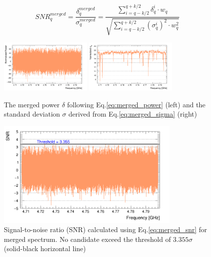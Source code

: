 \begin{equation}
    \label{eq:merged_snr}
    {SNR}_{q}^{merged} = \frac{\delta^{merged}_{q}}{\sigma^{merged}_{q}} = \frac{\sum_{i = q-k/2}^{q+k/2}\delta_{q}^{i} \cdot {w_{q}}}{ \sqrt{\sum_{i = q-k/2}^{q+k/2} (\sigma_{q}^{i})^2 \cdot {w_{q}^2}}}
\end{equation}


\begin{figure}[h]
    \centering
    \includegraphics[width=0.4\textwidth,height = 0.3\textwidth]{figures/Power_GrandSpectrum_AxionRun_AllSteps_Rescan_Merged_5bin_SG4_W201_LqWeight.png}
    \includegraphics[width=0.4\textwidth,height = 0.3\textwidth]{figures/Sigma_GrandSpectrum_AxionRun_AllSteps_Rescan_Merged_5bin_SG4_W201_LqWeight.png}
    \caption{The merged power $\delta$ following Eq.\eqref{eq:merged_power} (left) and the standard deviation $\sigma$ derived from Eq.\eqref{eq:merged_sigma} (right)}
    \label{fig:power_sigma_merged}
\end{figure}

\begin{figure}[hbt!]
    \centering
    \includegraphics[width=0.8\textwidth,height=0.4\textwidth]{figures/SNR_GrandSpectrum_AxionRun_AllSteps_Rescan_Merged_5bin_SG4_W201_LqWeight.png}
    \caption{Signal-to-noise ratio (SNR) calculated using Eq.\eqref{eq:merged_snr} for merged spectrum. No candidate exceed the threshold of $3.355\sigma$ (solid-black horizontal line) }
    \label{fig:SNR_merged}
\end{figure}


